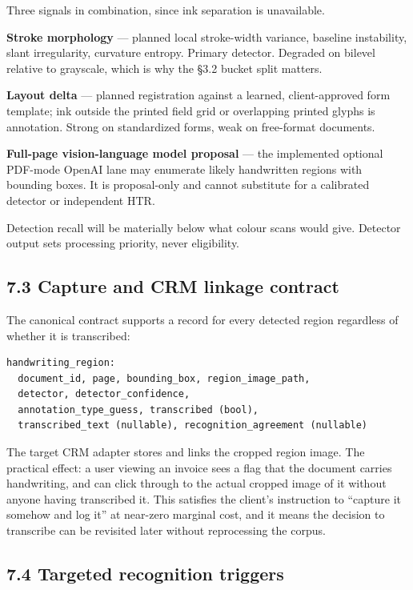\documentclass[
]{article}
\begin{document}
Three signals in combination, since ink separation is unavailable.

\textbf{Stroke morphology} --- planned local stroke-width variance,
baseline instability, slant irregularity, curvature entropy. Primary
detector. Degraded on bilevel relative to grayscale, which is why the
§3.2 bucket split matters.

\textbf{Layout delta} --- planned registration against a learned,
client-approved form template; ink outside the printed field grid or
overlapping printed glyphs is annotation. Strong on standardized forms,
weak on free-format documents.

\textbf{Full-page vision-language model proposal} --- the implemented
optional PDF-mode OpenAI lane may enumerate likely handwritten regions
with bounding boxes. It is proposal-only and cannot substitute for a
calibrated detector or independent HTR.

Detection recall will be materially below what colour scans would give.
Detector output sets processing priority, never eligibility.

\subsection{7.3 Capture and CRM linkage
contract}\label{capture-and-crm-linkage-contract}

The canonical contract supports a record for every detected region
regardless of whether it is transcribed:

\begin{verbatim}
handwriting_region:
  document_id, page, bounding_box, region_image_path,
  detector, detector_confidence,
  annotation_type_guess, transcribed (bool),
  transcribed_text (nullable), recognition_agreement (nullable)
\end{verbatim}

The target CRM adapter stores and links the cropped region image. The
practical effect: a user viewing an invoice sees a flag that the
document carries handwriting, and can click through to the actual
cropped image of it without anyone having transcribed it. This satisfies
the client's instruction to ``capture it somehow and log it'' at
near-zero marginal cost, and it means the decision to transcribe can be
revisited later without reprocessing the corpus.

\subsection{7.4 Targeted recognition
triggers}\label{targeted-recognition-triggers}
\end{document}

